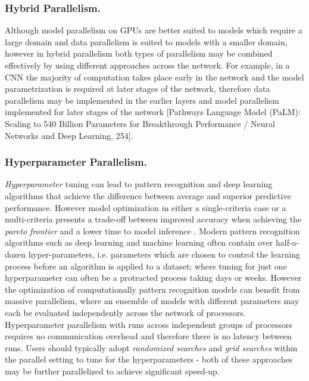 \documentclass[10pt]{article}[draft]
\begin{document}
\subsubsection{Hybrid Parallelism.}

Although model parallelism on GPUs are better suited to models which require a large domain and data parallelism is suited to models with a smaller domain, however in hybrid parallelism both types of parallelism  may be combined effectively by using different approaches across the network. For example, in a CNN the majority of computation takes place early in the network and the model parametrization is required at later stages of the network, therefore data parallelism may be implemented in the earlier layers and model parallelism implemented for later stages of the network [Pathways Language Model (PaLM): Scaling to 540 Billion Parameters for Breakthrough Performance / Neural Networks and Deep Learning, 254].


\subsubsection{Hyperparameter Parallelism.}

\emph{Hyperparameter} tuning can lead to pattern recognition  and deep learning algorithms that achieve the difference between average and superior predictive performance. However model optimization in either a single-criteria case or a multi-criteria presents a trade-off between improved accuracy when achieving the \emph{pareto frontier} and a lower time to model inference \cite{https://developer.nvidia.com/blog/sigopt-deep-learning-hyperparameter-optimization/}.  Modern pattern recognition algorithms such as deep learning and machine learning often contain over half-a-dozen {hyper-parameters}, i.e. parameters which are chosen to control the learning process before an algorithm is applied to a dataset; where tuning for just one hyperparameter can often be a protracted process taking days or weeks. However the optimization of computationally  pattern recognition models can benefit from  massive parallelism, where an ensemble of models with different parameters may each be evaluated independently across the network of processors. Hyperparameter parallelism with runs across independent groups of processors requires no communication overhead and therefore there is no latency between runs. Users should typically adopt \emph{randomized searches} and \emph{grid searches} within the parallel setting to tune for the hyperparameters - both of these approaches may be further parallelized to achieve significant speed-up.  
\end{document}
